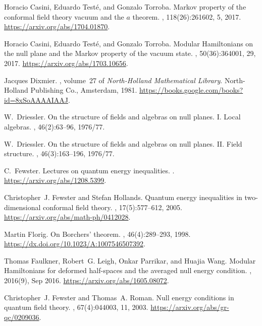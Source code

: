 \documentclass[12pt]{article}
\theoremstyle{remark}
\begin{document}
{\begin{thebibliography}{KLLSM18}
Horacio Casini, Eduardo Test\'{e}, and Gonzalo Torroba.
\newblock Markov property of the conformal field theory vacuum and the {$a$}
  theorem.
, 118(26):261602, 5, 2017.
\newblock \url{https://arxiv.org/abs/1704.01870}.

Horacio Casini, Eduardo Test\'{e}, and Gonzalo Torroba.
\newblock Modular {H}amiltonians on the null plane and the {M}arkov property of
  the vacuum state.
, 50(36):364001, 29, 2017.
\newblock \url{https://arxiv.org/abs/1703.10656}.

Jacques Dixmier.
, volume~27 of {\em North-Holland
  Mathematical Library}.
\newblock North-Holland Publishing Co., Amsterdam, 1981.
\newblock \url{https://books.google.com/books?id=8xSoAAAAIAAJ}.

W.~Driessler.
\newblock On the structure of fields and algebras on null planes. {I}. {L}ocal
  algebras.
, 46(2):63--96, 1976/77.

W.~Driessler.
\newblock On the structure of fields and algebras on null planes. {II}. {F}ield
  structure.
, 46(3):163--196, 1976/77.

C.~Fewster.
\newblock Lectures on quantum energy inequalities.
.
\newblock \url{https://arxiv.org/abs/1208.5399}.

Christopher~J. Fewster and Stefan Hollands.
\newblock Quantum energy inequalities in two-dimensional conformal field
  theory.
, 17(5):577--612, 2005.
\newblock \url{https://arxiv.org/abs/math-ph/0412028}.

Martin Florig.
\newblock On {B}orchers' theorem.
, 46(4):289--293, 1998.
\newblock \url{https://dx.doi.org/10.1023/A:1007546507392}.

Thomas Faulkner, Robert~G. Leigh, Onkar Parrikar, and Huajia Wang.
\newblock Modular {H}amiltonians for deformed half-spaces and the averaged null
  energy condition.
, 2016(9), Sep 2016.
\newblock \url{https://arxiv.org/abs/1605.08072}.

Christopher~J. Fewster and Thomas~A. Roman.
\newblock Null energy conditions in quantum field theory.
, 67(4):044003, 11, 2003.
\newblock \url{https://arxiv.org/abs/gr-qc/0209036}.


\end{thebibliography}}
\end{document}
